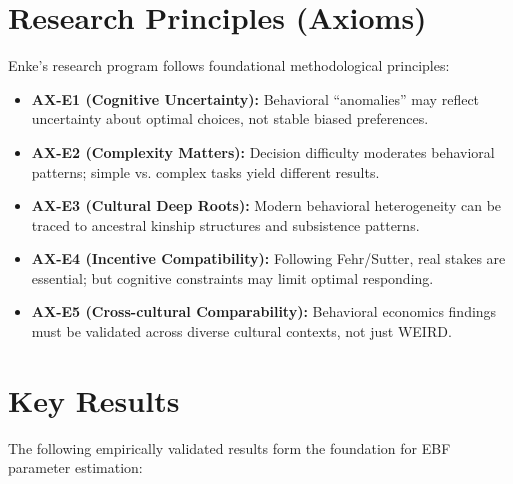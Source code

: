 \section{Research Principles (Axioms)}
\label{sec:enk-axioms}

Enke's research program follows foundational methodological principles:

\begin{itemize}
    \item \textbf{AX-E1 (Cognitive Uncertainty):} Behavioral ``anomalies'' may
    reflect uncertainty about optimal choices, not stable biased preferences.

    \item \textbf{AX-E2 (Complexity Matters):} Decision difficulty moderates
    behavioral patterns; simple vs. complex tasks yield different results.

    \item \textbf{AX-E3 (Cultural Deep Roots):} Modern behavioral heterogeneity
    can be traced to ancestral kinship structures and subsistence patterns.

    \item \textbf{AX-E4 (Incentive Compatibility):} Following Fehr/Sutter, real
    stakes are essential; but cognitive constraints may limit optimal responding.

    \item \textbf{AX-E5 (Cross-cultural Comparability):} Behavioral economics
    findings must be validated across diverse cultural contexts, not just WEIRD.
\end{itemize}


\section{Key Results}
\label{sec:enk-results}

The following empirically validated results form the foundation for EBF parameter
estimation:


